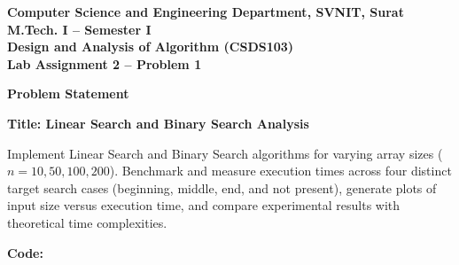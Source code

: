 \documentclass[12pt]{article}
\begin{document}

\begin{center}
\textbf{Computer Science and Engineering Department, SVNIT, Surat}\\
\textbf{M.Tech. I -- Semester I}\\
\textbf{Design and Analysis of Algorithm (CSDS103)}\\
\textbf{Lab Assignment 2 -- Problem 1}
\end{center}

\vspace{0.4cm}

\textbf{Problem Statement}

\textbf{Title: Linear Search and Binary Search Analysis}

Implement Linear Search and Binary Search algorithms for varying array sizes ($n = 10, 50, 100, 200$). Benchmark and measure execution times across four distinct target search cases (beginning, middle, end, and not present), generate plots of input size versus execution time, and compare experimental results with theoretical time complexities.

\vspace{0.3cm}

\textbf{Code:}
\end{document}
